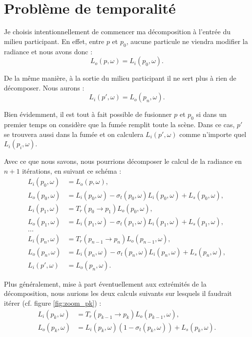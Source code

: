 \section{Problème de temporalité}

Je choisis intentionnellement de commencer ma décomposition à l'entrée du milieu participant. En effet, entre $p$ et $p_{0}$, aucune particule ne viendra modifier la radiance et nous avons donc :
$$L_{o}(p, \omega) = L_{i}(p_{0}, \omega).$$\par
De la même manière, à la sortie du milieu participant il ne sert plus à rien de décomposer. Nous aurons :
$$L_{i}(p', \omega) = L_{o}(p_{n}, \omega).$$\par
Bien évidemment, il est tout à fait possible de fusionner $p$ et $p_0$ si dans un premier temps on considère que la fumée remplit toute la scène. Dans ce cas, $p'$ se trouvera aussi dans la fumée et on calculera $L_{i}(p', \omega)$ comme n'importe quel $L_{i}(p_i, \omega)$.

Avec ce que nous savons, nous pourrions décomposer le calcul de la radiance en $n+1$ itérations, en suivant ce schéma :
\large \begin{align*}
L_{i}(p_{0}, \omega) &= L_{o}(p, \omega) ,\\
L_{o}(p_{0}, \omega) &= L_{i}(p_{0}, \omega) - \sigma_{t}(p_{0}, \omega)L_{i}(p_{0}, \omega) + L_s(p_{0}, \omega) ,\\
L_{i}(p_{1}, \omega) &= T_{r}(p_{0}\longrightarrow p_{1})L_{o}(p_{0}, \omega) ,\\
L_{o}(p_{1}, \omega) &= L_{i}(p_{1}, \omega) - \sigma_{t}(p_{1}, \omega)L_{i}(p_{1}, \omega) + L_s(p_{1}, \omega) ,\\
... \\
L_{i}(p_{n}, \omega) &= T_{r}(p_{n-1}\longrightarrow p_{n})L_{o}(p_{n-1}, \omega) ,\\
L_{o}(p_{n}, \omega) &= L_{i}(p_{n}, \omega) - \sigma_{t}(p_{n}, \omega)L_{i}(p_{n}, \omega) + L_s(p_{n}, \omega) ,\\
L_{i}(p', \omega) &= L_{o}(p_{n}, \omega)
.\end{align*} \normalsize\newline\par

Plus généralement, mise à part éventuellement aux extrémités de la décomposition, nous aurions les deux calculs suivants sur lesquels il faudrait itérer (cf. figure \ref{fig:zoom_pk}) :
\large \begin{align}
    \label{eq:deroulement_Li}
    L_{i}(p_{k}, \omega) &= T_{r}(p_{k-1}\longrightarrow p_{k})L_{o}(p_{k-1}, \omega) ,\\
    \label{eq:deroulement_Lo}
    L_{o}(p_{k}, \omega) &= L_{i}(p_{k}, \omega)(1 - \sigma_{t}(p_{k}, \omega)) + L_s(p_{k}, \omega)
.\end{align} \normalsize

